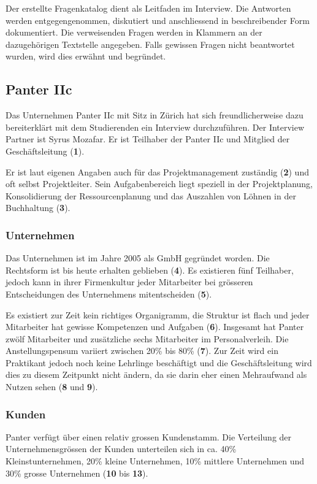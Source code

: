 Der erstellte Fragenkatalog dient als Leitfaden im Interview. Die Antworten
werden entgegengenommen, diskutiert und anschliessend in beschreibender Form
dokumentiert. Die verweisenden Fragen werden in Klammern an der dazugehörigen
Textstelle angegeben. Falls gewissen Fragen nicht beantwortet wurden, wird dies 
erwähnt und begründet.

\subsection{Panter IIc}
Das Unternehmen Panter IIc mit Sitz in Zürich hat sich freundlicherweise dazu
bereiterklärt mit dem Studierenden ein Interview durchzuführen. Der Interview
Partner ist Syrus Mozafar. Er ist Teilhaber der Panter IIc und Mitglied der
Geschäftsleitung (\textbf{1}).

Er ist laut eigenen Angaben auch für das Projektmanagement zuständig (\textbf{2})
und oft selbst Projektleiter. Sein Aufgabenbereich liegt speziell in der 
Projektplanung, Konsolidierung der Ressourcenplanung und das Auszahlen von
Löhnen in der Buchhaltung (\textbf{3}).

\subsubsection{Unternehmen}
Das Unternehmen ist im Jahre 2005 als GmbH gegründet worden. Die Rechtsform
ist bis heute erhalten geblieben (\textbf{4}). Es existieren fünf Teilhaber,
jedoch kann in ihrer Firmenkultur jeder Mitarbeiter bei grösseren Entscheidungen
des Unternehmens mitentscheiden (\textbf{5}).

Es existiert zur Zeit kein richtiges Organigramm, die Struktur ist flach
und jeder Mitarbeiter hat gewisse Kompetenzen und Aufgaben (\textbf{6}). 
Insgesamt hat Panter zwölf Mitarbeiter und zusätzliche sechs Mitarbeiter im
Personalverleih. Die Anstellungspensum variiert zwischen 20\% bis 80\% (\textbf{7}).
Zur Zeit wird ein Praktikant jedoch noch keine Lehrlinge beschäftigt und die Geschäftsleitung
wird dies zu diesem Zeitpunkt nicht ändern, da sie darin eher einen Mehraufwand
als Nutzen sehen (\textbf{8} und \textbf{9}).

\subsubsection{Kunden}
Panter verfügt über einen relativ grossen Kundenstamm. Die Verteilung
der Unternehmensgrössen der Kunden unterteilen sich in ca. 40\% Kleinstunternehmen,
20\% kleine Unternehmen, 10\% mittlere Unternehmen und 30\% grosse
Unternehmen (\textbf{10} bis \textbf{13}).

